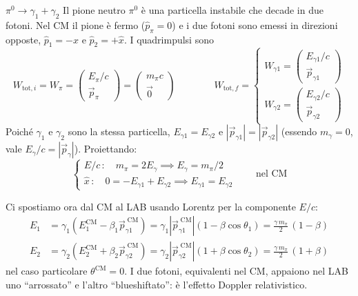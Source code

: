 \begin{esempio}{$\pi^0 \to \gamma_1 + \gamma_2$}
Il pione neutro $\pi^0$ è una particella instabile che decade in due fotoni. Nel CM il pione è fermo ($\hat{p}_{\pi} = 0$) e i due fotoni sono emessi in direzioni opposte, $\hat{p}_1 = -\hat{x}$ e $\hat{p}_2 = +\hat{x}$. I quadrimpulsi sono
\begin{equation*}
    W_{\text{tot},i} = W_{\pi} = \begin{pmatrix} E_{\pi}/c \\ \vec{p}_{\pi} \end{pmatrix} = \begin{pmatrix} m_{\pi}c \\ \vec{0} \end{pmatrix}
    \qquad\qquad
    W_{\text{tot},f} =
    \begin{cases}
        W_{\gamma 1} = \begin{pmatrix} E_{\gamma 1}/c \\ \vec{p}_{\gamma 1} \end{pmatrix} \\[10pt]
        W_{\gamma 2} = \begin{pmatrix} E_{\gamma 2}/c \\ \vec{p}_{\gamma 2} \end{pmatrix}
    \end{cases}
\end{equation*}
Poiché $\gamma_1$ e $\gamma_2$ sono la stessa particella, $E_{\gamma 1} = E_{\gamma 2}$ e $|\vec{p}_{\gamma 1}| = |\vec{p}_{\gamma 2}|$ (essendo $m_{\gamma} = 0$, vale $E_{\gamma}/c = |\vec{p}_{\gamma}|$). Proiettando:
\begin{equation*}
    \begin{cases}
        E/c \, : \quad m_{\pi} = 2E_{\gamma} \implies E_{\gamma} = m_{\pi}/2 \\
        \hat{x} \, : \quad 0 = -E_{\gamma 1} + E_{\gamma 2} \implies E_{\gamma 1} = E_{\gamma 2}
    \end{cases}
    \qquad \text{nel CM}
\end{equation*}

Ci spostiamo ora dal CM al LAB usando Lorentz per la componente $E/c$:
\begin{align}
    E_1 &= \gamma_1 \left(E_1^{\text{CM}} - \beta_1 \vec{p}_{\gamma 1}^{\;\text{CM}}\right)
         = \gamma_1 |\vec{p}_{\gamma 1}^{\;\text{CM}}| \left(1 - \beta\cos\theta_1\right)
         = \frac{\gamma\, m_{\pi}}{2}\,(1 - \beta) \\
    E_2 &= \gamma_2 \left(E_2^{\text{CM}} + \beta_2 \vec{p}_{\gamma 2}^{\;\text{CM}}\right)
         = \gamma_2 |\vec{p}_{\gamma 2}^{\;\text{CM}}| \left(1 + \beta\cos\theta_2\right)
         = \frac{\gamma\, m_{\pi}}{2}\,(1 + \beta)
\end{align}
nel caso particolare $\theta^{\text{CM}} = 0$. I due fotoni, equivalenti nel CM, appaiono nel LAB uno ``arrossato'' e l'altro ``blueshiftato'': è l'effetto Doppler relativistico.
\end{esempio}

